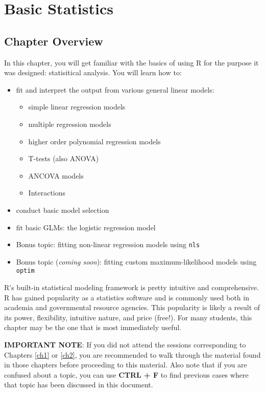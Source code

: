 \documentclass[]{book}
\providecommand{\tightlist}{%
  \setlength{\itemsep}{0pt}\setlength{\parskip}{0pt}}
\theoremstyle{definition}
\theoremstyle{definition}
\theoremstyle{definition}
\theoremstyle{remark}
\begin{document}
\chapter{Basic Statistics}\label{ch3}

\section*{Chapter Overview}\label{chapter-overview-2}

In this chapter, you will get familiar with the basics of using R for
the purpose it was designed: statisitical analysis. You will learn how
to:

\begin{itemize}
\tightlist
\item
  fit and interpret the output from various general linear models:

  \begin{itemize}
  \tightlist
  \item
    simple linear regression models
  \item
    multiple regression models
  \item
    higher order polynomial regression models
  \item
    T-tests (also ANOVA)
  \item
    ANCOVA models
  \item
    Interactions
  \end{itemize}
\item
  conduct basic model selection
\item
  fit basic GLMs: the logistic regression model
\item
  Bonus topic: fitting non-linear regression models using \texttt{nls}
\item
  Bonus topic (\emph{coming soon}): fitting custom maximum-likelihood
  models using \texttt{optim}
\end{itemize}

R's built-in statistical modeling framework is pretty intuitive and
comprehensive. R has gained popularity as a statistics software and is
commonly used both in academia and governmental resource agencies. This
popularity is likely a result of its power, flexibility, intuitive
nature, and price (free!). For many students, this chapter may be the
one that is most immediately useful.

\textbf{IMPORTANT NOTE}: If you did not attend the sessions
corresponding to Chapters \ref{ch1} or \ref{ch2}, you are recommended to
walk through the material found in those chapters before proceeding to
this material. Also note that if you are confused about a topic, you can
use \textbf{CTRL + F} to find previous cases where that topic has been
discussed in this document.
\end{document}
